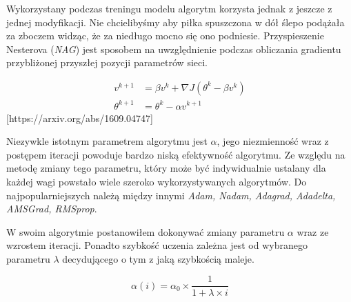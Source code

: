 \documentclass[]{article}
\theoremstyle{definition}
\begin{document}
Wykorzystany podczas treningu modelu algorytm korzysta jednak z jeszcze z jednej modyfikacji. Nie chcielibyśmy aby piłka spuszczona w dół ślepo podążała za zboczem widząc, że za niedługo mocno się ono podniesie. Przyspieszenie Nesterova (\textit{NAG}) jest sposobem na uwzględnienie podczas obliczania gradientu przybliżonej przyszłej pozycji parametrów sieci.	

\begin{align} 
v^{k+1} &=  \beta v^{k}+ \nabla J(\theta^{k} - \beta v^{k}) \\[0.4em]
\theta^{k+1} &=  \theta^{k }- \alpha v^{k+1}
\end{align}
[https://arxiv.org/abs/1609.04747]






Niezywkle istotnym parametrem algorytmu jest $\alpha$, jego niezmienność wraz z postępem iteracji powoduje bardzo niską efektywność algorytmu. Ze względu na metodę zmiany tego parametru, który może być indywidualnie ustalany dla każdej wagi powstało wiele szeroko wykorzystywanych algorytmów. Do najpopularniejszych należą między innymi \textit{Adam, Nadam, Adagrad, Adadelta, AMSGrad, RMSprop}. 

W swoim algorytmie postanowiłem dokonywać zmiany parametru $\alpha$ wraz ze wzrostem iteracji. Ponadto szybkość uczenia zależna jest od wybranego parametru $\lambda$ decydującego o tym z jaką szybkością maleje.

\begin{equation}
\alpha(i) = \alpha_0 \times \frac{1}{1 + \lambda \times i}
\end{equation}
\end{document}
